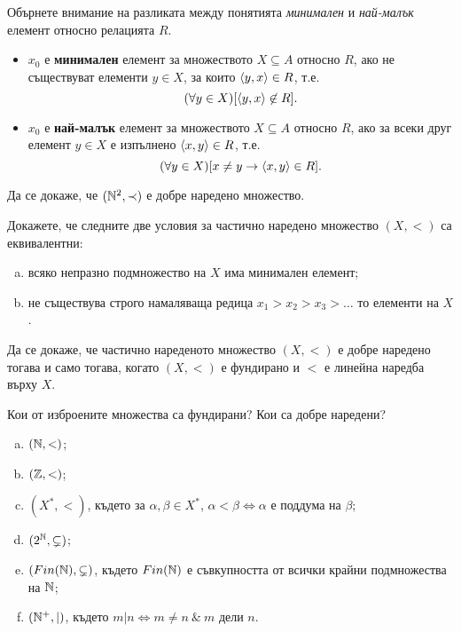 \begin{remark}
  Обърнете внимание на разликата между понятията {\em минимален} и {\em най-малък} елемент относно релацията $R$.
  \begin{itemize}
  \item $x_0$ е {\bf минимален} елемент за множеството $X \subseteq A$ относно $R$,
    ако не съществуват елементи $y \in X$, за които $\langle{y,x}\rangle\in R$, т.е.
    \[(\forall y \in X)[\langle{y,x}\rangle \not\in R].\]
  \item $x_0$ е {\bf най-малък} елемент за множеството $X \subseteq A$ относно $R$,
    ако за всеки друг елемент $y \in X$ е изпълнено $\langle{x,y}\rangle\in R$, т.е.
    \[(\forall y \in X)[x\neq y \rightarrow \langle{x,y}\rangle \in R].\]
  \end{itemize}
\end{remark}

\begin{problem}
  Да се докаже, че $(\mathbb{N}^2,\prec)$ е добре наредено множество.
\end{problem}

\begin{problem}
  Докажете, че следните две условия за частично наредено множество $(X,<)$ са еквивалентни:
  \begin{enumerate}[a)]
  \item
    всяко непразно подмножество на $X$ има минимален елемент;
  \item
    не съществува строго намаляваща редица $x_1>x_2>x_3>\dots$ то елементи на $X$.
  \end{enumerate}
\end{problem}

\begin{problem}
  Да се докаже, че частично нареденото множество $(X,<)$ е добре наредено тогава и само тогава, когато 
  $(X,<)$ е фундирано и $<$ е линейна наредба върху $X$.
\end{problem}

\begin{problem}%
  Кои от изброените множества са фундирани? Кои са добре наредени?
  \begin{enumerate}[a)]
  \item
    $(\mathbb{N},<)$;
  \item
    $(\mathbb{Z},<)$;
  \item
    $(X^*, <)$, където за $\alpha,\beta\in X^*$, $\alpha < \beta \iff \alpha\mbox{ е поддума на }\beta$;
  \item
    $(2^{\mathbb{N}},\subsetneq)$;
  \item
    $(Fin(\mathbb{N}),\subsetneq)$, където $Fin(\mathbb{N})$ е съвкупността от всички крайни подмножества на $\mathbb{N}$;
  \item
    $(\mathbb{N}^+,|)$, където $m|n \iff m\neq n\ \&\ m\mbox{ дели }n$.
  \end{enumerate}
\end{problem}


